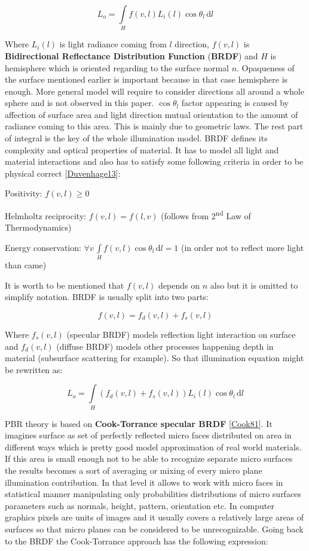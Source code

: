 \[L_o=\int\limits_H f(v, l) L_i(l) \cos\theta_l\, \mathrm{d}l\]

Where $L_i(l)$ is light radiance coming from $l$ direction, $f(v,l)$ is {\bfseries Bidirectional Reflectance Distribution Function} ({\bfseries B\+R\+DF}) and $H$ is hemisphere which is oriented regarding to the surface normal $n$. Opaqueness of the surface mentioned earlier is important because in that case hemisphere is enough. More general model will require to consider directions all around a whole sphere and is not observed in this paper. $\cos\theta_l$ factor appearing is caused by affection of surface area and light direction mutual orientation to the amount of radiance coming to this area. This is mainly due to geometric laws. The rest part of integral is the key of the whole illumination model. B\+R\+DF defines it\textquotesingle{}s complexity and optical properties of material. It has to model all light and material interactions and also has to satisfy some following criteria in order to be physical correct \mbox{[}\hyperlink{specification__pbr_math_Duvenhage13}{Duvenhage13}\mbox{]}\+:
\begin{DoxyItemize}
\item Positivity\+: $f(v,l) \geq 0$
\item Helmholtz reciprocity\+: $f(v,l) = f(l, v)$ (follows from 2\textsuperscript{nd} Law of Thermodynamics)
\item Energy conservation\+: $\displaystyle \forall v \, \int\limits_H f(v,l) \cos\theta_l \, \mathrm{d}l = 1$ (in order not to reflect more light than came)
\end{DoxyItemize}

It is worth to be mentioned that $f(v,l)$ depends on $n$ also but it is omitted to simplify notation. B\+R\+DF is usually split into two parts\+:

\[f(v,l) = f_d(v,l)+f_s(v, l)\]

Where $f_s(v, l)$ (specular B\+R\+DF) models reflection light interaction on surface and $f_d(v,l)$ (diffuse B\+R\+DF) models other processes happening depth in material (subsurface scattering for example). So that illumination equation might be rewritten as\+:

\[L_o=\int\limits_H (f_d(v,l)+f_s(v, l)) L_i(l) \cos\theta_l\, \mathrm{d}l\]

P\+BR theory is based on {\bfseries Cook-\/\+Torrance specular B\+R\+DF} \mbox{[}\hyperlink{specification__pbr_math_Cook81}{Cook81}\mbox{]}. It imagines surface as set of perfectly reflected micro faces distributed on area in different ways which is pretty good model approximation of real world materials. If this area is small enough not to be able to recognize separate micro surfaces the results becomes a sort of averaging or mixing of every micro plane illumination contribution. In that level it allows to work with micro faces in statistical manner manipulating only probabilities distributions of micro surfaces parameters such as normals, height, pattern, orientation etc. In computer graphics pixels are units of images and it usually covers a relatively large areas of surfaces so that micro planes can be considered to be unrecognizable. Going back to the B\+R\+DF the Cook-\/\+Torrance approach has the following expression\+:

